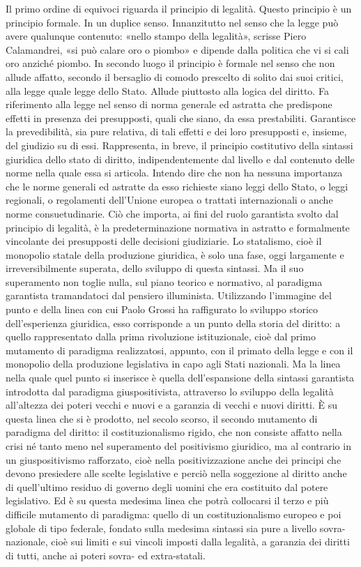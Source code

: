 Il primo ordine di equivoci riguarda il principio di legalità. Questo principio è un principio formale. In un duplice senso. Innanzitutto nel senso che la legge può avere qualunque contenuto: «nello stampo della legalità», scrisse Piero Calamandrei, «si può calare oro o piombo» e dipende dalla politica che vi si cali oro anziché piombo. In secondo luogo il principio è formale nel senso che non allude affatto, secondo il bersaglio di comodo prescelto di solito dai suoi critici, alla legge quale legge dello Stato. Allude piuttosto alla logica del diritto. Fa riferimento alla legge nel senso di norma generale ed astratta che predispone effetti in presenza dei presupposti, quali che siano, da essa prestabiliti. Garantisce la prevedibilità, sia pure relativa, di tali effetti e dei loro presupposti e, insieme, del giudizio su di essi. Rappresenta, in breve, il principio costitutivo della sintassi giuridica dello stato di diritto, indipendentemente dal livello e dal contenuto delle norme nella quale essa si articola. Intendo dire che non ha nessuna importanza che le norme generali ed astratte da esso richieste siano leggi dello Stato, o leggi regionali, o regolamenti dell’Unione europea o trattati internazionali o anche norme consuetudinarie. Ciò che importa, ai fini del ruolo garantista svolto dal principio di legalità, è la predeterminazione normativa in astratto e formalmente vincolante dei presupposti delle decisioni giudiziarie. Lo statalismo, cioè il monopolio statale della produzione giuridica, è solo una fase, oggi largamente e irreversibilmente superata, dello sviluppo di questa sintassi. Ma il suo superamento non toglie nulla, sul piano teorico e normativo, al paradigma garantista tramandatoci dal pensiero illuminista. Utilizzando l’immagine del punto e della linea con cui Paolo Grossi ha raffigurato lo sviluppo storico dell’esperienza giuridica, esso corrisponde a un punto della storia del diritto: a quello rappresentato dalla prima rivoluzione istituzionale, cioè dal primo mutamento di paradigma realizzatosi, appunto, con il primato della legge e con il monopolio della produzione legislativa in capo agli Stati nazionali. Ma la linea nella quale quel punto si inserisce è quella dell’espansione della sintassi garantista introdotta dal paradigma giuspositivista, attraverso lo sviluppo della legalità all’altezza dei poteri vecchi e nuovi e a garanzia di vecchi e nuovi diritti. È su questa linea che si è prodotto, nel secolo scorso, il secondo mutamento di paradigma del diritto: il costituzionalismo rigido, che non consiste affatto nella crisi né tanto meno nel superamento del positivismo giuridico, ma al contrario in un giuspositivismo rafforzato, cioè nella positivizzazione anche dei principi che devono presiedere alle scelte legislative e perciò nella soggezione al diritto anche di quell’ultimo residuo di governo degli uomini che era costituito dal potere legislativo. Ed è su questa medesima linea che potrà collocarsi il terzo e più difficile mutamento di paradigma: quello di un costituzionalismo europeo e poi globale di tipo federale, fondato sulla medesima sintassi sia pure a livello sovra-nazionale, cioè sui limiti e sui vincoli imposti dalla legalità, a garanzia dei diritti di tutti, anche ai poteri sovra- ed extra-statali.
